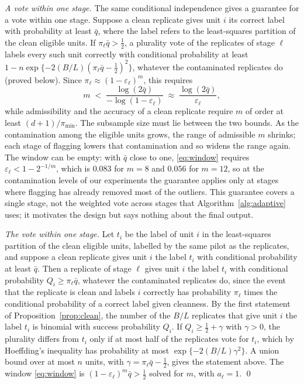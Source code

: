 \emph{A vote within one stage.} The same conditional independence gives a guarantee for a vote within one stage. Suppose a
clean replicate gives unit $i$ its correct label with probability at least $\bar q$, where the
label refers to the least-squares partition of the clean eligible units. If
$\pi_\ell\bar q>\tfrac12$, a plurality vote of the replicates of stage $\ell$ labels every such
unit correctly with conditional probability at least $1-n\exp\{-2(B/L)(\pi_\ell\bar q-\tfrac12)^{2}\}$,
whatever the contaminated replicates do (proved below). Since
$\pi_\ell\approx(1-\varepsilon_\ell)^{m}$, this requires
\begin{equation}
m\;<\;\frac{\log(2\bar q)}{-\log(1-\varepsilon_\ell)}\;\approx\;\frac{\log(2\bar q)}{\varepsilon_\ell},
\label{eq:window}
\end{equation}
while admissibility and the accuracy of a clean replicate require $m$ of order at least
$(d+1)/\pi_{\min}$. The subsample size must lie between the two bounds. As the contamination among the eligible
units grows, the range of admissible $m$ shrinks; each stage of flagging lowers that
contamination and so widens the range again. The window can be empty: with $\bar q$ close to one, \eqref{eq:window} requires
$\varepsilon_\ell<1-2^{-1/m}$, which is $0.083$ for $m=8$ and $0.056$ for $m=12$, so at the
contamination levels of our experiments the guarantee applies only at stages where flagging has
already removed most of the outliers. This guarantee covers a single stage, not the weighted vote across stages that
Algorithm~\ref{alg:adaptive} uses; it motivates the design but says nothing about the final
output.

\emph{The vote within one stage.} Let $t_i$ be the label of unit $i$ in the least-squares
partition of the clean eligible units, labelled by the same pilot as the replicates, and
suppose a clean replicate gives unit $i$ the label $t_i$ with conditional probability at
least $\bar q$. Then a replicate of stage $\ell$ gives unit $i$ the label $t_i$ with
conditional probability $Q_i\ge\pi_\ell\bar q$, whatever the contaminated replicates do, since
the event that the replicate is clean and labels $i$ correctly has probability $\pi_\ell$ times
the conditional probability of a correct label given cleanness. By the first statement of Proposition~\ref{prop:clean}, the number of
the $B/L$ replicates that give unit $i$ the label $t_i$ is binomial with success probability
$Q_i$. If $Q_i\ge\tfrac12+\gamma$ with $\gamma>0$, the plurality differs from $t_i$ only if
at most half of the replicates vote for $t_i$, which by Hoeffding's inequality has
probability at most $\exp\{-2(B/L)\gamma^{2}\}$. A union bound over at most $n$ units, with
$\gamma=\pi_\ell\bar q-\tfrac12$, gives the statement above. The window
\eqref{eq:window} is $(1-\varepsilon_\ell)^{m}\bar q>\tfrac12$ solved for $m$, with $a_\ell=1$. \qed

